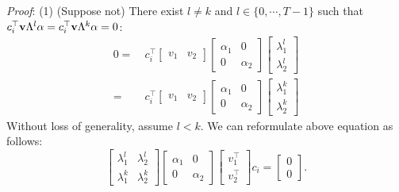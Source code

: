 \documentclass[../thesis.tex]{subfiles}
\begin{document}
\textit{Proof}:
(1) %
 (Suppose not) %
There exist $l \neq k$ and $l \in \{ 0, \cdots, T-1 \}$ such that $c_i^\top {\bf v} \Lambda^l \alpha = c_i^\top {\bf v} \Lambda^k \alpha= 0$:
\begin{equation}
\begin{aligned}
0 = ~& c_i^\top \begin{bmatrix} v_1 & v_2 \end{bmatrix} \begin{bmatrix} \alpha_1 & 0 \\ 0 & \alpha_2 \end{bmatrix} \begin{bmatrix} \lambda_1^l \\ \lambda_2^l \end{bmatrix} \\
= ~ & c_i^\top \begin{bmatrix} v_1 & v_2 \end{bmatrix} \begin{bmatrix} \alpha_1 & 0 \\ 0 & \alpha_2 \end{bmatrix} \begin{bmatrix} \lambda_1^k \\ \lambda_2^k \end{bmatrix} \nonumber
\end{aligned}
\end{equation}
Without loss of generality, assume $l<k$. We can reformulate above equation as follows:
\begin{equation}
	\begin{bmatrix} \lambda_1^{l} & \lambda_2^l \\ \lambda_1^k & \lambda_2^k \end{bmatrix} \begin{bmatrix} \alpha_1 & 0 \\ 0 & \alpha_2 \end{bmatrix} 
	\begin{bmatrix} v_1^\top \\ v_2^\top \end{bmatrix} c_i = \begin{bmatrix} 0 \\ 0 \end{bmatrix}. \nonumber 
\end{equation}
\end{document}
